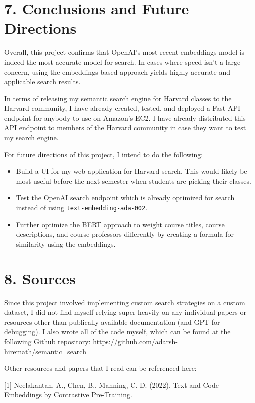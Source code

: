 \documentclass[
	a4paper, %
	10pt, %
	unnumberedsections, %
	twoside, %
]{LTJournalArticle}
\begin{document}
\section{7. Conclusions and Future Directions}

Overall, this project confirms that OpenAI's most recent embeddings model is indeed the most accurate model for search. In cases where speed isn't a large concern, using the embeddings-based approach yields highly accurate and applicable search results. 

In terms of releasing my semantic search engine for Harvard classes to the Harvard community, I have already created, tested, and deployed a Fast API endpoint for anybody to use on Amazon's EC2. I have already distributed this API endpoint to members of the Harvard community in case they want to test my search engine. 


For future directions of this project, I intend to do the following: 
\begin{itemize}
	\item Build a UI for my web application for Harvard search. This would likely be most useful before the next semester when students are picking their classes. 
	\item Test the OpenAI search endpoint which is already optimized for search instead of using \texttt{text-embedding-ada-002}. 
	\item Further optimize the BERT approach to weight course titles, course descriptions, and course professors differently by creating a formula for similarity using the embeddings. 
\end{itemize}

\section{8. Sources}

Since this project involved implementing custom search strategies on a custom dataset, I did not find myself relying super heavily on any individual papers or resources other than publically available documentation (and GPT for debugging). I also wrote all of the code myself, which can be found at the following Github repository: \url{https://github.com/adarsh-hiremath/semantic_search} 

Other resources and papers that I read can be referenced here:

\enter

[1] Neelakantan, A., Chen, B., Manning, C. D. (2022). Text and Code Embeddings by Contrastive Pre-Training.
\end{document}

